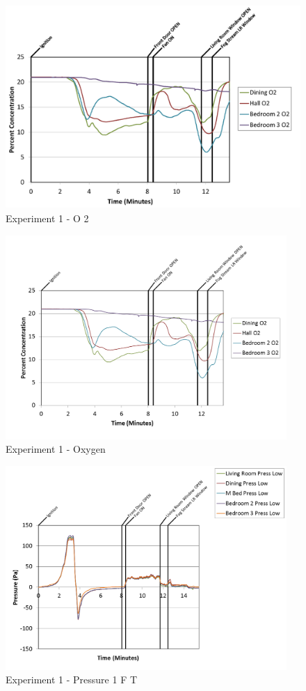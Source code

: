 \documentclass{article}
\begin{document}
\begin{appendices}
\clearpage

\begin{figure}[h!]
	\centering
	\includegraphics[height=3.05in]{0_Images/Results_Charts/Exp_1_Charts/O2.png}
	\caption{Experiment 1 - O 2}
\end{figure}


\begin{figure}[h!]
	\centering
	\includegraphics[height=3.05in]{0_Images/Results_Charts/Exp_1_Charts/Oxygen.png}
	\caption{Experiment 1 - Oxygen}
\end{figure}

\clearpage

\begin{figure}[h!]
	\centering
	\includegraphics[height=3.05in]{0_Images/Results_Charts/Exp_1_Charts/Pressure1FT.png}
	\caption{Experiment 1 - Pressure 1 F T}
\end{figure}



\end{appendices}
\end{document}
